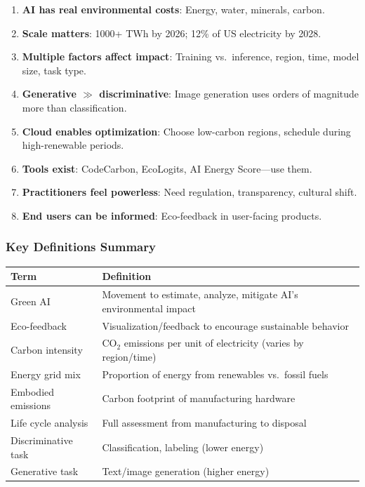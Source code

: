 \begin{enumerate}
  \item \textbf{AI has real environmental costs}: Energy, water, minerals, carbon.
  \item \textbf{Scale matters}: 1000+ TWh by 2026; 12\% of US electricity by 2028.
  \item \textbf{Multiple factors affect impact}: Training vs.\ inference, region, time, model size, task type.
  \item \textbf{Generative $\gg$ discriminative}: Image generation uses orders of magnitude more than classification.
  \item \textbf{Cloud enables optimization}: Choose low-carbon regions, schedule during high-renewable periods.
  \item \textbf{Tools exist}: CodeCarbon, EcoLogits, AI Energy Score---use them.
  \item \textbf{Practitioners feel powerless}: Need regulation, transparency, cultural shift.
  \item \textbf{End users can be informed}: Eco-feedback in user-facing products.
\end{enumerate}

\subsubsection*{Key Definitions Summary}

\begin{center}
\renewcommand{\arraystretch}{1.3}
\begin{tabular}{@{} l p{8cm} @{}}
\toprule
\textbf{Term} & \textbf{Definition} \\
\midrule
Green AI & Movement to estimate, analyze, mitigate AI's environmental impact \\
Eco-feedback & Visualization/feedback to encourage sustainable behavior \\
Carbon intensity & CO$_2$ emissions per unit of electricity (varies by region/time) \\
Energy grid mix & Proportion of energy from renewables vs.\ fossil fuels \\
Embodied emissions & Carbon footprint of manufacturing hardware \\
Life cycle analysis & Full assessment from manufacturing to disposal \\
Discriminative task & Classification, labeling (lower energy) \\
Generative task & Text/image generation (higher energy) \\
\bottomrule
\end{tabular}
\end{center}


